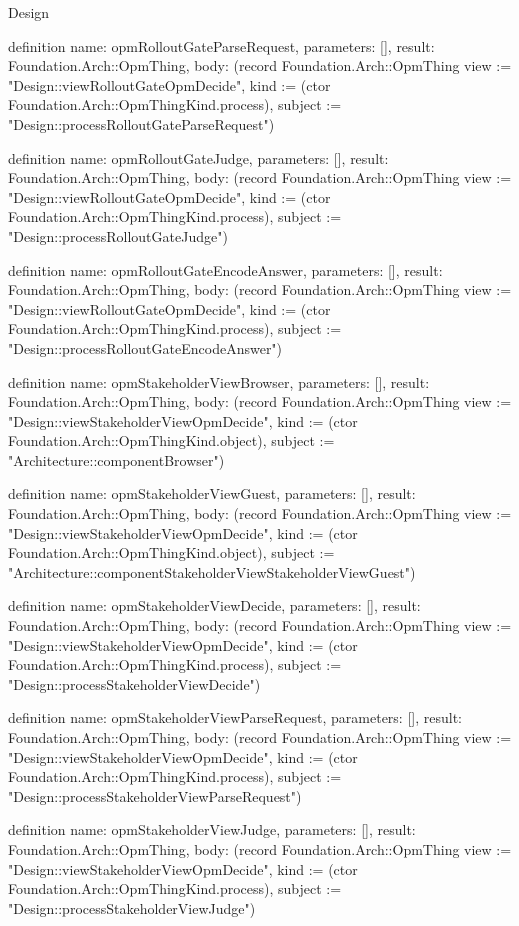 \begin{lexlean}{Design}
\begin{semanticmodule}
definition{
  name: opmRolloutGateParseRequest,
  parameters: [],
  result: Foundation.Arch::OpmThing,
  body: (record Foundation.Arch::OpmThing {view := "Design::viewRolloutGateOpmDecide", kind := (ctor Foundation.Arch::OpmThingKind.process), subject := "Design::processRolloutGateParseRequest"})
}

definition{
  name: opmRolloutGateJudge,
  parameters: [],
  result: Foundation.Arch::OpmThing,
  body: (record Foundation.Arch::OpmThing {view := "Design::viewRolloutGateOpmDecide", kind := (ctor Foundation.Arch::OpmThingKind.process), subject := "Design::processRolloutGateJudge"})
}

definition{
  name: opmRolloutGateEncodeAnswer,
  parameters: [],
  result: Foundation.Arch::OpmThing,
  body: (record Foundation.Arch::OpmThing {view := "Design::viewRolloutGateOpmDecide", kind := (ctor Foundation.Arch::OpmThingKind.process), subject := "Design::processRolloutGateEncodeAnswer"})
}

definition{
  name: opmStakeholderViewBrowser,
  parameters: [],
  result: Foundation.Arch::OpmThing,
  body: (record Foundation.Arch::OpmThing {view := "Design::viewStakeholderViewOpmDecide", kind := (ctor Foundation.Arch::OpmThingKind.object), subject := "Architecture::componentBrowser"})
}

definition{
  name: opmStakeholderViewGuest,
  parameters: [],
  result: Foundation.Arch::OpmThing,
  body: (record Foundation.Arch::OpmThing {view := "Design::viewStakeholderViewOpmDecide", kind := (ctor Foundation.Arch::OpmThingKind.object), subject := "Architecture::componentStakeholderViewStakeholderViewGuest"})
}

definition{
  name: opmStakeholderViewDecide,
  parameters: [],
  result: Foundation.Arch::OpmThing,
  body: (record Foundation.Arch::OpmThing {view := "Design::viewStakeholderViewOpmDecide", kind := (ctor Foundation.Arch::OpmThingKind.process), subject := "Design::processStakeholderViewDecide"})
}

definition{
  name: opmStakeholderViewParseRequest,
  parameters: [],
  result: Foundation.Arch::OpmThing,
  body: (record Foundation.Arch::OpmThing {view := "Design::viewStakeholderViewOpmDecide", kind := (ctor Foundation.Arch::OpmThingKind.process), subject := "Design::processStakeholderViewParseRequest"})
}

definition{
  name: opmStakeholderViewJudge,
  parameters: [],
  result: Foundation.Arch::OpmThing,
  body: (record Foundation.Arch::OpmThing {view := "Design::viewStakeholderViewOpmDecide", kind := (ctor Foundation.Arch::OpmThingKind.process), subject := "Design::processStakeholderViewJudge"})
}


\end{semanticmodule}
\end{lexlean}
